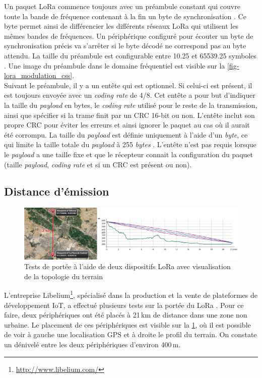 Un paquet LoRa commence toujours avec un préambule constant qui couvre toute la bande de fréquence contenant à la fin un byte de synchronisation \cite{AStudyof31:online}. Ce byte permet ainsi de différencier les différents réseaux LoRa qui utilisent les mêmes bandes de fréquences. Un périphérique configuré pour écouter un byte de synchronisation précis va s'arrêter si le byte décodé ne correspond pas au byte attendu. La taille du préambule est configurable entre 10.25 et 65539.25 symboles \cite{AStudyof31:online}. Une image du préambule dans le domaine fréquentiel est visible sur la \cref{fig-lora_modulation_css}.\\

Suivant le préambule, il y a un entête qui est optionnel. Si celui-ci est présent, il est toujours envoyée avec un \textit{coding rate} de 4/8. Cet entête a pour but d'indiquer la taille du \textit{payload} en bytes, le \textit{coding rate} utilisé pour le reste de la transmission, ainsi que spécifier si la trame finit par un CRC 16-bit ou non. L'entête inclut son propre CRC pour éviter les erreurs et ainsi ignorer le paquet au cas où il aurait été corrompu. La taille du \textit{payload} est définie uniquement à l'aide d'un \textit{byte}, ce qui limite la taille totale du \textit{payload} à 255 \textit{bytes} \cite{AStudyof31:online}. L'entête n'est pas requis lorsque le \textit{payload} a une taille fixe et que le récepteur connait la configuration du paquet (taille \textit{payload}, \textit{coding rate} et si un CRC est présent ou non).


\FloatBarrier
\subsection{Distance d'émission}
\begin{figure}[ht!]
    \centering
    \includegraphics[width=1.0\textwidth]{Figures/StateOfTheArt/lora_distance_measure.png}
    \caption{Tests de portée à l'aide de deux dispositifs LoRa avec visualisation de la topologie du terrain}
    \label{fig-lora_distance_measure}
\end{figure}
L'entreprise Libelium\footnote{\url{http://www.libelium.com/}}, spécialisé dans la production et la vente de plateformes de développement IoT, a effectué plusieurs tests sur la portée du LoRa \cite{waspmote8:online}. Pour ce faire, deux périphériques ont été placés à 21\,km de distance dans une zone non urbaine. Le placement de ces périphériques est visible sur la \cref{fig-lora_distance_measure}, où il est possible de voir à gauche une localisation GPS et à droite le profil du terrain. On constate un dénivelé entre les deux périphériques d'environ 400\,m.\\

